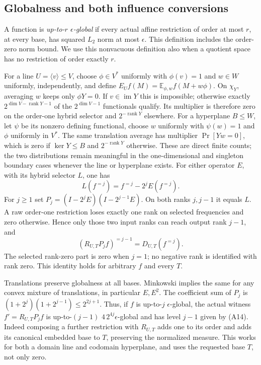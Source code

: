 \subsection{Globalness and both influence conversions}
A function is \emph{up-to-$r$ $\epsilon$-global} if every actual affine
restriction of order at most $r$, at every base, has squared $L_2$ norm
at most $\epsilon$. This definition includes the order-zero norm bound.
We use this nonvacuous definition also when a quotient space has no
restriction of order exactly $r$.

For a line $U=\langle v\rangle\le V$, choose $\phi\in V^*$ uniformly
with $\phi(v)=1$ and $w\in W$ uniformly, independently, and define
$E_Uf(M)=\mathbb E_{\phi,w}f(M+w\phi)$.
On $\chi_Y$, averaging $w$ keeps only $\phi Y=0$.
If $v\in\operatorname{im}Y$ this is impossible; otherwise exactly
$2^{\dim V-\operatorname{rank}Y-1}$ of the $2^{\dim V-1}$ functionals
qualify. Its multiplier is therefore zero on the order-one hybrid
selector and $2^{-\operatorname{rank}Y}$ elsewhere.
For a hyperplane $B\le W$, let $\psi$ be its nonzero defining functional,
choose $w$ uniformly with $\psi(w)=1$ and $\phi$ uniformly in $V^*$.
The same translation average has multiplier
$\Pr[Yw=0]$, which is zero if $\ker Y\le B$ and
$2^{-\operatorname{rank}Y}$ otherwise. These are direct finite counts;
the two distributions remain meaningful in the one-dimensional and
singleton boundary cases whenever the line or hyperplane exists.
For either operator $E$, with its hybrid selector $L$, one has
\[
 L(f^{=j})=f^{=j}-2^jE(f^{=j}).                     \tag{A13}
\]
For $j\ge1$ set
$P_j=(I-2^jE)(I-2^{j-1}E)$.
On both ranks $j,j-1$ it equals $L$. A raw order-one restriction loses
exactly one rank on selected frequencies and zero otherwise. Hence only
those two input ranks can reach output rank $j-1$, and
\[
 (R_{U,T}P_jf)^{=j-1}=D_{U,T}(f^{=j}).              \tag{A14}
\]
The selected rank-zero part is zero when $j=1$; no negative rank is
identified with rank zero. This identity holds for arbitrary $f$ and
every $T$.

Translations preserve globalness at all bases. Minkowski implies the
same for any convex mixture of translations, in particular $E,E^2$.
The coefficient sum of $P_j$ is
$(1+2^j)(1+2^{j-1})\le2^{2j+1}$.
Thus, if $f$ is up-to-$j$ $\epsilon$-global, the actual witness
$f'=R_{U,T}P_jf$ is up-to-$(j-1)$
$4\,2^{4j}\epsilon$-global and has level $j-1$ given by (A14).
Indeed composing a further restriction with $R_{U,T}$ adds one to its
order and adds its canonical embedded base to $T$, preserving the
normalized measure. This works for both a domain line and codomain
hyperplane, and uses the requested base $T$, not only zero.

